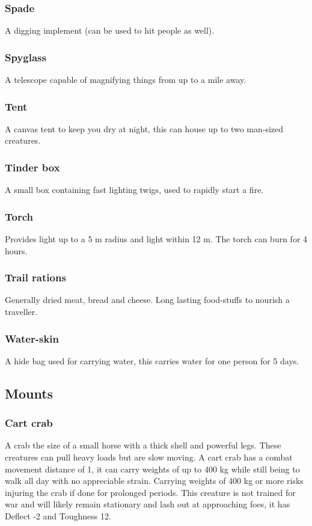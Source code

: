 \documentclass[a4paper,11pt,oneside]{book}
\newcommand{\textlf}[1]{\textbf{\titlecap{#1}}}
\begin{document}
\subsubsection*{Spade}
A digging implement (can be used to hit people as well).

\subsubsection*{Spyglass}
A telescope capable of magnifying things from up to a mile away.

\subsubsection*{Tent}
A canvas tent to keep you dry at night, this can house up to two man-sized creatures.

\subsubsection*{Tinder box}
A small box containing fast lighting twigs, used to rapidly start a fire.

\subsubsection*{Torch}
Provides \textlf{full} light up to a 5 m radius and \textlf{low} light within 12 m. The torch can burn for 4 hours.

\subsubsection*{Trail rations}
Generally dried meat, bread and cheese. Long lasting food-stuffs to nourish a traveller.

\subsubsection*{Water-skin}
A hide bag used for carrying water, this carries water for one person for 5 days.

\subsection{Mounts}

\subsubsection*{Cart crab}
A crab the size of a small horse with a thick shell and powerful legs. These creatures can pull heavy loads but are slow moving. A cart crab has a combat movement distance of 1, it can carry weights of up to 400 kg while still being to walk all day with no appreciable strain. Carrying weights of 400 kg or more risks injuring the crab if done for prolonged periods. This creature is not trained for war and will likely remain stationary and lash out at approaching foes, it has Deflect -2 and Toughness 12.
\end{document}
